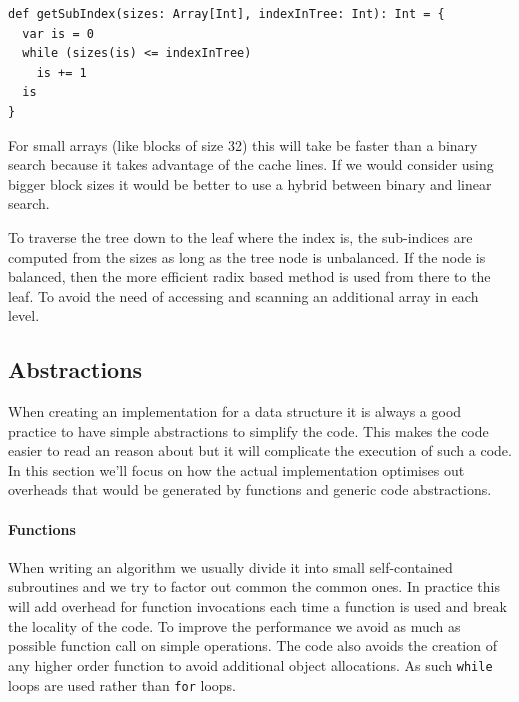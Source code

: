 \begin{lstlisting}[frame=single]
def getSubIndex(sizes: Array[Int], indexInTree: Int): Int = {
  var is = 0
  while (sizes(is) <= indexInTree)
    is += 1
  is
}
\end{lstlisting}

For small arrays (like blocks of size 32) this will take be faster than a binary search because it takes advantage of the cache lines. If we would consider using bigger block sizes it would be better to use a hybrid between binary and linear search.

To traverse the tree down to the leaf where the index is, the sub-indices are computed from the sizes as long as the tree node is unbalanced. If the node is balanced, then the more efficient radix based method is used from there to the leaf. To avoid the need of accessing and scanning an additional array in each level.



\subsection{Abstractions}
\label{sec:Abstractions}
When creating an implementation for a data structure it is always a good practice to have simple abstractions to simplify the code. This makes the code easier to read an reason about but it will complicate the execution of such a code. In this section we'll focus on how the actual implementation optimises out overheads that would be generated by functions and generic code abstractions.

\paragraph{Functions} When writing an algorithm we usually divide it into small self-contained subroutines and we try to factor out common the common ones. In practice this will add overhead for function invocations each time a function is used and break the locality of the code. To improve the performance we avoid as much as possible function call on simple operations. The code also avoids the creation of any higher order function to avoid additional object allocations. As such \texttt{while} loops are used rather than \texttt{for} loops.


